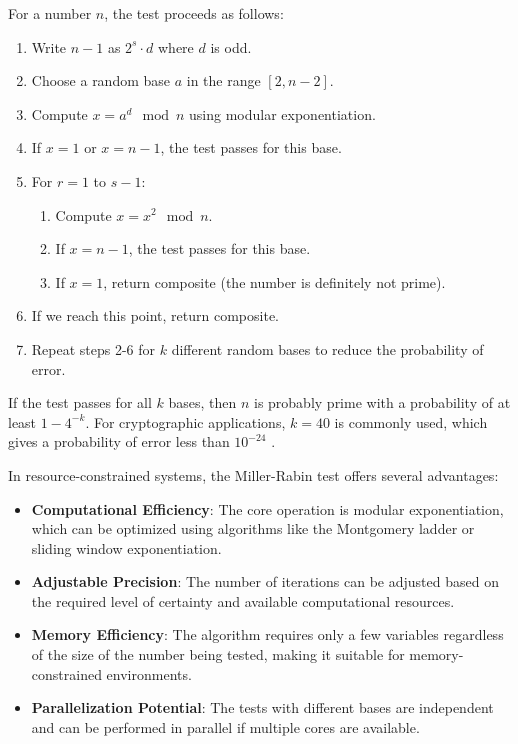 For a number $n$, the test proceeds as follows:

\begin{enumerate}
    \item Write $n-1$ as $2^s \cdot d$ where $d$ is odd.
    
    \item Choose a random base $a$ in the range $[2, n-2]$.
    
    \item Compute $x = a^d \mod n$ using modular exponentiation.
    
    \item If $x = 1$ or $x = n-1$, the test passes for this base.
    
    \item For $r = 1$ to $s-1$:
    \begin{enumerate}
        \item Compute $x = x^2 \mod n$.
        \item If $x = n-1$, the test passes for this base.
        \item If $x = 1$, return composite (the number is definitely not prime).
    \end{enumerate}
    
    \item If we reach this point, return composite.
    
    \item Repeat steps 2-6 for $k$ different random bases to reduce the probability of error.
\end{enumerate}

If the test passes for all $k$ bases, then $n$ is probably prime with a probability of at least $1 - 4^{-k}$. For cryptographic applications, $k = 40$ is commonly used, which gives a probability of error less than $10^{-24}$ \cite{baillie_performance}.

In resource-constrained systems, the Miller-Rabin test offers several advantages:

\begin{itemize}
    \item \textbf{Computational Efficiency}: The core operation is modular exponentiation, which can be optimized using algorithms like the Montgomery ladder \cite{joye2006} or sliding window exponentiation.
    
    \item \textbf{Adjustable Precision}: The number of iterations can be adjusted based on the required level of certainty and available computational resources.
    
    \item \textbf{Memory Efficiency}: The algorithm requires only a few variables regardless of the size of the number being tested, making it suitable for memory-constrained environments.
    
    \item \textbf{Parallelization Potential}: The tests with different bases are independent and can be performed in parallel if multiple cores are available.
\end{itemize}

